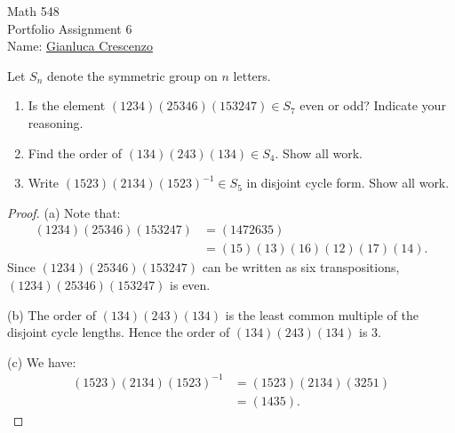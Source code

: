\documentclass[10pt,twoside,openany]{memoir}
\begin{document}
\begin{center}
    {\Large Math 548 \\[0.1in]Portfolio Assignment 6}\\[.175in]
    {Name:} {\underline{Gianluca Crescenzo\hspace*{2in}}}\\[0.15in]
    \end{center}
    \vspace{4pt}
\begin{problem}[S25, P2]
Let $S_n$ denote the symmetric group on $n$ letters.
\begin{enumerate}[label = (\alph*),itemsep=1pt,topsep=3pt]
    \item Is the element $(1234)(25346)(153247) \in S_7$ even or odd? Indicate your reasoning.
    \item Find the order of $(134)(243)(134) \in S_4$. Show all work.
    \item Write $(1523)(2134)(1523)^{-1} \in S_5$ in disjoint cycle form. Show all work.
\end{enumerate}
\end{problem}
    {\color{blue} \begin{proof}
        (a) Note that:
            \begin{equation*}
            \begin{split}
                (1234)(25346)(153247)
                & = (1472635) \\
                & = (15)(13)(16)(12)(17)(14).
            \end{split}
            \end{equation*}
        Since $(1234)(25346)(153247)$ can be written as six transpositions, $(1234)(25346)(153247)$ is even.

        (b) The order of $(134)(243)(134)$ is the least common multiple of the disjoint cycle lengths. Hence the order of $(134)(243)(134)$ is 3.

        (c) We have:
            \begin{equation*}
            \begin{split}
                (1523)(2134)(1523)^{-1}
                & = (1523)(2134)(3251) \\
                & = (1435).
            \end{split}
            \end{equation*}
    \end{proof}}
\end{document}
